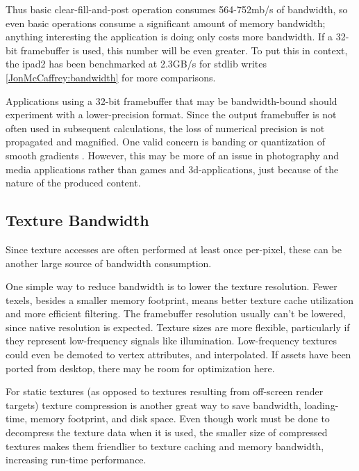 
Thus basic clear-fill-and-post operation consumes 564-752mb/s of bandwidth, so
even basic operations consume a significant amount of memory bandwidth;
anything interesting the application is doing only costs more bandwidth.  If a
32-bit framebuffer is used, this number will be even greater.  To put this in
context, the ipad2 has been benchmarked at 2.3GB/s for stdlib writes
\cite{Shimpi11}  \ref{JonMcCaffrey:bandwidth} for more comparisons.


Applications using a 32-bit framebuffer that may be bandwidth-bound should
experiment with a lower-precision format.  Since the output framebuffer is not
often used in subsequent calculations, the loss of numerical precision is not
propagated and magnified.  One valid concern is banding or quantization of
smooth gradients \cite{Guy10}.  However, this may be more of an issue in
photography and media applications rather than games and 3d-applications, just
because of the nature of the produced content.

\subsection{Texture Bandwidth}\label{JonMcCaffrey-Texture-Bandwidth} Since
texture accesses are often performed at least once per-pixel, these can be
another large source of bandwidth consumption.


One simple way to reduce bandwidth is to lower the texture resolution.  Fewer
texels, besides a smaller memory footprint, means better texture cache
utilization and more efficient filtering.  The framebuffer resolution usually
can't be lowered, since native resolution is expected.  Texture sizes are more
flexible, particularly if they represent low-frequency signals like
illumination.  Low-frequency textures could even be demoted to vertex
attributes, and interpolated.  If assets have been ported from desktop, there
may be room for optimization here.


For static textures (as opposed to textures resulting from off-screen render
targets) texture compression is another great way to save bandwidth,
loading-time, memory footprint, and disk space.  Even though work must be done
to decompress the texture data when it is used, the smaller size of compressed
textures makes them friendlier to texture caching and memory bandwidth,
increasing run-time performance. 

